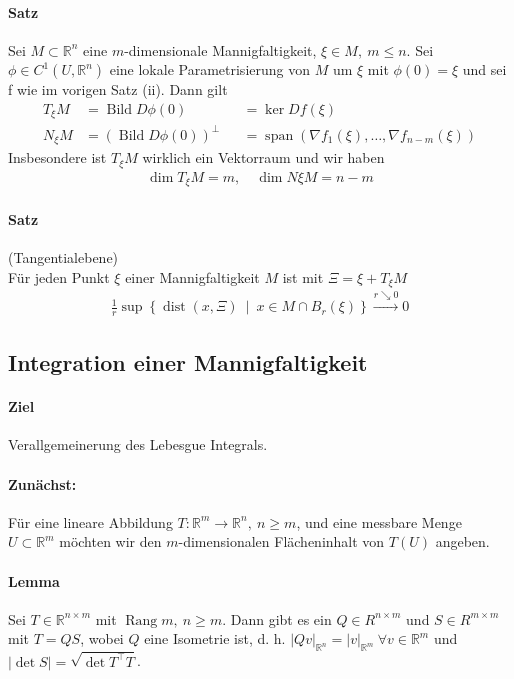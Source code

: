 \documentclass[12pt,a4paper,fleqn]{article}
\def\abs#1{{\left\vert #1 \right\vert}}
\def\set#1{{\left\{ #1 \right\}}}
\def\Mid{\ \middle|\ }
\def\R{{\mathbb{R}}}
\begin{document}
\paragraph{Satz} Sei $M \subset \R^n$ eine $m$-dimensionale Mannigfaltigkeit, $\xi \in M,\ m \leq n$. Sei $\phi \in C^1(U, \R^n)$ eine lokale Parametrisierung von $M$ um $\xi$ mit $\phi(0) = \xi$ und sei f wie im vorigen Satz (ii). Dann gilt
\begin{align*}
T_\xi M &= \operatorname{Bild} D\phi(0) &&= \ker Df(\xi) \\
N_\xi M &= (\operatorname{Bild} D\phi(0))^\perp &&= \operatorname{span}(\nabla f_1(\xi), \dotsc, \nabla f_{n- m}(\xi))
\end{align*}
Insbesondere ist $T_\xi M$ wirklich ein Vektorraum und wir haben 
\begin{align*}
\dim T_\xi M = m,\quad \dim N\xi M = n-m
\end{align*}

\paragraph{Satz} (Tangentialebene)\\
Für jeden Punkt $\xi$ einer Mannigfaltigkeit $M$ ist mit $\Xi = \xi + T_\xi M$
\begin{align*}
\frac{1}{r}\sup\set{\operatorname{dist}(x, \Xi) \Mid x \in M\cap B_r(\xi)} \xrightarrow{r \searrow 0} 0
\end{align*}

\subsection{Integration einer Mannigfaltigkeit}

\paragraph{Ziel} Verallgemeinerung des Lebesgue Integrals.

\paragraph{Zunächst:} Für eine lineare Abbildung $T \colon \R^m \rightarrow \R^n,\ n \geq m$, und eine messbare Menge $U \subset \R^m$ möchten wir den $m$-dimensionalen Flächeninhalt von $T(U)$ angeben.

\paragraph{Lemma} Sei $T \in \R^{n \times m}$ mit $\operatorname{Rang} m,\ n \geq m$. Dann gibt es ein $Q \in R^{n \times m}$ und $S \in R^{m \times m}$ mit $T = QS$, wobei $Q$ eine Isometrie ist, d. h. $\abs{Qv}_{\R^n} = \abs{v}_{\R^m}\ \forall v \in \R^m$ und $\abs{\det S} = \sqrt{\det T^\top T}$.
\end{document}
